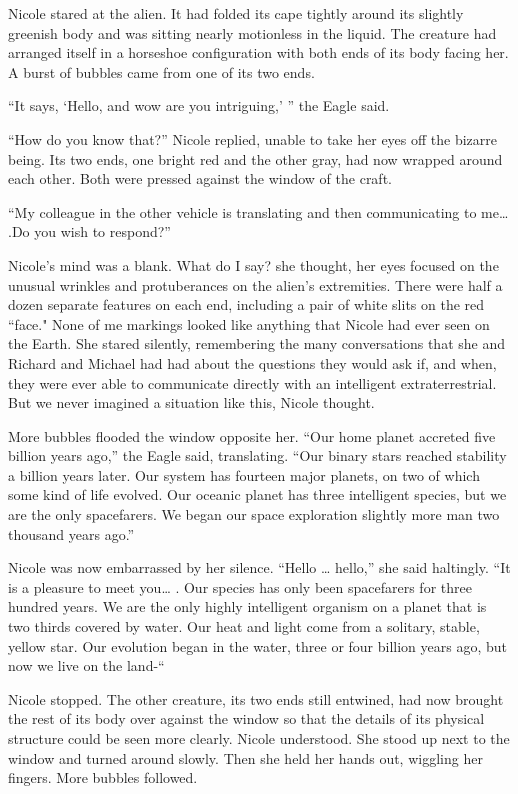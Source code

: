 \documentclass[]{article}
\begin{document}
{Nicole stared at the alien.  It had folded its cape tightly around its slightly greenish body and was sitting nearly motionless in the liquid.  The creature had arranged itself in a horseshoe configuration with both ends of its body facing her.  A burst of bubbles came from one of its two ends.

“It says, ‘Hello, and wow are you intriguing,’ ” the Eagle said.

“How do you know that?” Nicole replied, unable to take her eyes off the bizarre being.  Its two ends, one bright red and the other gray, had now wrapped around each other.  Both were pressed against the window of the craft.

“My colleague in the other vehicle is translating and then communicating to me… .Do you wish to respond?”

Nicole’s mind was a blank.  What do I say? she thought, her eyes focused on the unusual wrinkles and protuberances on the alien’s extremities.  There were half a dozen separate features on each end, including a pair of white slits on the red “face."  None of me markings looked like anything that Nicole had ever seen on the Earth.  She stared silently, remembering the many conversations that she and Richard and Michael had had about the questions they would ask if, and when, they were ever able to communicate directly with an intelligent extraterrestrial.  But we never imagined a situation like this, Nicole thought.

More bubbles flooded the window opposite her.  “Our home planet accreted five billion years ago,” the Eagle said, translating.  “Our binary stars reached stability a billion years later.  Our system has fourteen major planets, on two of which some kind of life evolved.  Our oceanic planet has three intelligent species, but we are the only spacefarers.  We began our space exploration slightly more man two thousand years ago.”

Nicole was now embarrassed by her silence.  “Hello … hello,” she said haltingly.  “It is a pleasure to meet you… .  Our species has only been spacefarers for three hundred years.  We are the only highly intelligent organism on a planet that is two thirds covered by water.  Our heat and light come from a solitary, stable, yellow star.  Our evolution began in the water, three or four billion years ago, but now we live on the land-“

Nicole stopped.  The other creature, its two ends still entwined, had now brought the rest of its body over against the window so that the details of its physical structure could be seen more clearly.  Nicole understood.  She stood up next to the window and turned around slowly.  Then she held her hands out, wiggling her fingers.  More bubbles followed.

}
\end{document}
